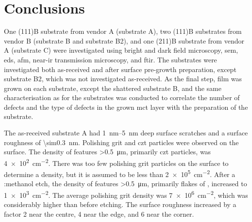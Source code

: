 \chapter{Conclusions}\label{ch:conclusion}

One (111)B substrate from vendor A (substrate A), two (111)B substrates from vendor B (substrate B and substrate B2), and one (211)B substrate from vendor A (substrate C) were investigated using bright and dark field microscopy, \ac{sem}, \ac{eds}, \ac{afm}, near-\ac{ir} transmission microscopy, and \ac{ftir}. The substrates were investigated both as-received and after surface pre-growth preparation, except substrate B2, which was not investigated as-received. As the final step,  film was grown on each substrate, except the shattered substrate B, and the same characterisation as for the substrates was conducted to correlate the number of defects and the type of defects in the grown \ac{mct} layer with the preparation of the substrate.

The as-received substrate A had \SIrange{1}{5}{\nano\metre} deep surface scratches and a surface roughness of \SI{\sim0.3}{\nano\metre}. Polishing grit and \ac{czt} particles were observed on the surface. The density of features \SI{>0.5}{\micro\metre}, primarily \ac{czt} particles, was \SI{4e2}{\centi\metre^{-2}}. There was too few polishing grit particles on the surface to determine a density, but it is assumed to be less than \SI{2e5}{\centi\metre^{-2}}. After a :methanol etch, the density of features \SI{>0.5}{\micro\metre}, primarily flakes of , increased to \SI{1e3}{\centi\metre^{-2}}. The average polishing grit density was \SI{7e6}{\centi\metre^{-2}}, which was considerably higher than before etching. The surface roughness increased by a factor 2 near the centre, 4 near the edge, and 6 near the corner. 

